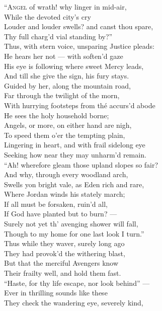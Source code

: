“\textsc{Angel} of wrath! why linger in mid-air, \\
 While the devoted city’s cry \\
 Louder and louder swells? and canst thou spare, \\
 Thy full charg’d vial standing by?” \\
 Thus, with stern voice, unsparing Justice pleads: \\
 He hears her not — with soften’d gaze \\
 His eye is following where sweet Mercy leads, \\
 And till she give the sign, his fury stays. \\
  Guided by her, along the mountain road, \\
 Far through the twilight of the morn, \\
 With hurrying footsteps from thé accurs’d abode \\
 He sees the holy household borne; \\
 Angels, or more, on either hand are nigh, \\
 To speed them o’er the tempting plain, \\
 Lingering in heart, and with frail sidelong eye \\
 Seeking how near they may unharm’d remain. \\
  “Ah! wherefore gleam those upland slopes so fair? \\
 And why, through every woodland arch, \\
 Swells yon bright vale, as Eden rich and rare, \\
 Where Jordan winds his stately march; \\
 If all must be forsaken, ruin’d all, \\
 If God have planted but to burn? — \\
 Surely not yet th’ avenging shower will fall, \\
 Though to my home for one last look I turn.” \\
  Thus while they waver, surely long ago \\
 They had provok’d the withering blast, \\
 But that the merciful Avengers know \\
 Their frailty well, and hold them fast. \\
 “Haste, for thy life escape, nor look behind” — \\
 Ever in thrilling sounds like these \\
 They check the wandering eye, severely kind, \\
